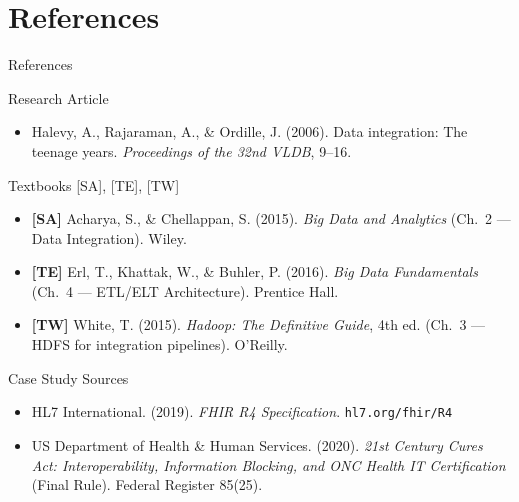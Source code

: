 \documentclass[aspectratio=169,10pt]{beamer}
\begin{document}
\section*{References}

\begin{frame}{References}
  \begin{block}{Research Article}
    \begin{itemize}
      \item Halevy, A., Rajaraman, A., \& Ordille, J. (2006).
            Data integration: The teenage years.
            \textit{Proceedings of the 32nd VLDB}, 9--16.
    \end{itemize}
  \end{block}
  \vspace{4pt}
  \begin{block}{Textbooks \textmd{[SA], [TE], [TW]}}
    \begin{itemize}
      \item \textbf{[SA]} Acharya, S., \& Chellappan, S. (2015).
            \textit{Big Data and Analytics} (Ch.~2 — Data Integration).
            Wiley.
      \item \textbf{[TE]} Erl, T., Khattak, W., \& Buhler, P. (2016).
            \textit{Big Data Fundamentals} (Ch.~4 — ETL/ELT Architecture).
            Prentice Hall.
      \item \textbf{[TW]} White, T. (2015).
            \textit{Hadoop: The Definitive Guide}, 4th ed.
            (Ch.~3 — HDFS for integration pipelines). O'Reilly.
    \end{itemize}
  \end{block}
  \vspace{4pt}
  \begin{block}{Case Study Sources}
    \begin{itemize}
      \item HL7 International. (2019). \textit{FHIR R4 Specification}.
            \texttt{hl7.org/fhir/R4}
      \item US Department of Health \& Human Services. (2020).
            \textit{21st Century Cures Act: Interoperability, Information Blocking,
            and ONC Health IT Certification} (Final Rule). Federal Register 85(25).
    \end{itemize}
  \end{block}
\end{frame}
\end{document}
